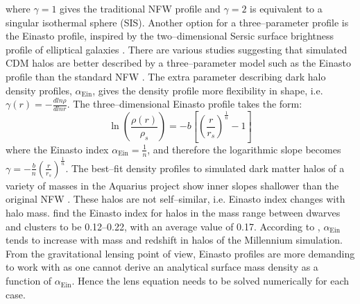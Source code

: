 \documentclass[paper=a4, fontsize=11pt]{scrartcl} %
\numberwithin{equation}{section} %
\numberwithin{figure}{section} %
\numberwithin{table}{section} %
\begin{document}
where $\gamma = 1$ gives the traditional NFW profile and $\gamma = 2$ is equivalent to a singular isothermal sphere (SIS). Another option for a three--parameter profile is the Einasto profile, inspired by the two--dimensional Sersic surface brightness profile of elliptical galaxies \citep[][]{Einasto1965}. There are various studies suggesting that simulated CDM halos are better described by a three--parameter model such as the Einasto profile than the standard NFW \citep[e.g.][]{Navarro+2004, Gao+2008, DiCintio+2014, Dutton.Maccio2014}. The extra parameter describing dark halo density profiles, $\alpha_\mathrm{Ein}$, gives the density profile more flexibility in shape, i.e. $\gamma(r)=-\frac{dln\rho}{dlnr}$. The three--dimensional Einasto profile takes the form:
\begin{equation}
\ln\left(\frac{\rho(r)}{\rho_s}\right) = -b\left[\left(\frac{r}{r_s}\right)^{\frac{1}{n}} - 1\right] \nonumber
\end{equation}
where the Einasto index $\alpha_\mathrm{Ein} = \frac{1}{n}$, and therefore the logarithmic slope becomes $\gamma = -\frac{b}{n}(\frac{r}{r_s})^\frac{1}{n}$. The best--fit density profiles to simulated dark matter halos of a variety of masses in the Aquarius project show inner slopes shallower than the original NFW \citep{Navarro+2010}. These halos are not self--similar, i.e. Einasto index changes with halo mass. \citet{Navarro+2004} find the Einasto index for halos in the mass range between dwarves and clusters to be 0.12--0.22, with an average value of 0.17. According to \citet{Hayashi.White2008, Gao+2008}, $\alpha_\mathrm{Ein}$ tends to increase with mass and redshift in halos of the Millennium simulation. From the gravitational lensing point of view, Einasto profiles are more demanding to work with as one cannot derive an analytical surface mass density as a function of $\alpha_\mathrm{Ein}$. Hence the lens equation needs to be solved numerically for each case.


\end{document}
